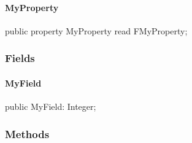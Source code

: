 \documentclass{report}
\begin{document}
\paragraph*{MyProperty}\hspace*{\fill}

\begin{list}{}{
\setlength{\itemindent}{0cm}
\setlength{\listparindent}{0cm}
\setlength{\leftmargin}{\evensidemargin}
\addtolength{\leftmargin}{\tmplength}
\settowidth{\labelsep}{X}
\addtolength{\leftmargin}{\labelsep}
\setlength{\labelwidth}{\tmplength}
}
\begin{flushleft}
\item[\textbf{Declaration}\hfill]
\begin{ttfamily}
public property MyProperty read FMyProperty;\end{ttfamily}


\end{flushleft}
\end{list}
\subsubsection*{\large{\textbf{Fields}}\normalsize\hspace{1ex}\hfill}
\paragraph*{MyField}\hspace*{\fill}

\begin{list}{}{
\setlength{\itemindent}{0cm}
\setlength{\listparindent}{0cm}
\setlength{\leftmargin}{\evensidemargin}
\addtolength{\leftmargin}{\tmplength}
\settowidth{\labelsep}{X}
\addtolength{\leftmargin}{\labelsep}
\setlength{\labelwidth}{\tmplength}
}
\begin{flushleft}
\item[\textbf{Declaration}\hfill]
\begin{ttfamily}
public MyField: Integer;\end{ttfamily}


\end{flushleft}
\end{list}
\subsubsection*{\large{\textbf{Methods}}\normalsize\hspace{1ex}\hfill}
\end{document}
